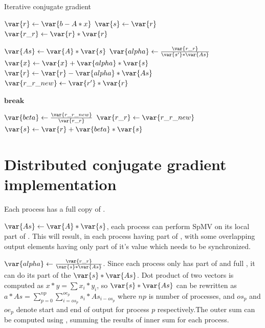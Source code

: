 \documentclass[thesis=M,english]{FITthesis}[2019/12/23]
\begin{document}
\begin{algorithm}
    \caption{Iterative conjugate gradient}
    \begin{algorithmic}
        \State $\var{r} \gets \var{b - A * x}$
        \State $\var{s} \gets \var{r}$
        \State $\var{r\_r} \gets \var{r} * \var{r}$

        \State $\var{As} \gets \var{A} * \var{s}$
        \State $\var{alpha} \gets \frac{\var{r\_r}}{\var{s'}*\var{As}} $
        \State $\var{x} \gets \var{x} + \var{alpha} * \var{s}$
        \State $\var{r} \gets \var{r} - \var{alpha} * \var{As}$
        \State $\var{r\_r\_new} \gets \var{r'} * \var{r}$

        \State $\textbf{break}$
        \EndIf

        \State $\var{beta} \gets \frac{\var{r\_r\_new}}{\var{r\_r}}$
        \State $\var{r\_r} \gets \var{r\_r\_new}$
        \State $\var{s} \gets \var{r} + \var{beta} * \var{s}$

        \EndFor

        \EndFunction
    \end{algorithmic}
\end{algorithm}

\section{Distributed conjugate gradient implementation}

Each process has a full copy of .

$\var{As} \gets \var{A} * \var{s}$, each process can perform SpMV on its local part of
. This will result, in each process having part of , with some overlapping
output elements having only part of it's value which needs to be synchronized.

$\var{alpha} \gets \frac{\var{r\_r}}{\var{s} * \var{As}}$. Since each process only has part of
 and full , it can do its part of the $\var{s} * \var{As}$.
Dot product of two vectors is computed as $x * y = \sum x_i * y_i$, so $\var{s} * \var{As}$
can be rewritten as $a * As = \sum_{p=0}^{np} \sum_{i=os_p}^{oe_p} s_i * As_{i-os_p}$ where
$np$ is number of processes, and $os_p$ and $oe_p$ denote start and end of output for process
$p$ respectively.The outer sum can be computed using ,
summing the results of inner sum for each process.
\end{document}
